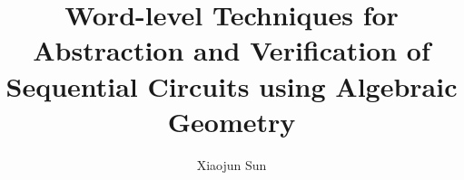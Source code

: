 \documentclass[Chicago]{uuthesis2e}
\title{Word-level Techniques for Abstraction and Verification of Sequential Circuits using Algebraic Geometry}
\author{Xiaojun Sun}
\newcommand{\ls}[1]
    {\dimen0=\fontdimen6\the\font
     \lineskip=#1\dimen0
     \advance\lineskip.5\fontdimen5\the\font
     \advance\lineskip-\dimen0
     \lineskiplimit=.9\lineskip
     \baselineskip=\lineskip
     \advance\baselineskip\dimen0
     \normallineskip\lineskip
     \normallineskiplimit\lineskiplimit
     \normalbaselineskip\baselineskip
     \ignorespaces
    }
\begin{document}

\frontmatterformat
\titlepage
\copyrightpage
\committeeapproval
\readingapproval

\tableofcontents
\listoffigures
\listoftables


\maintext       %




%













\end{document}
